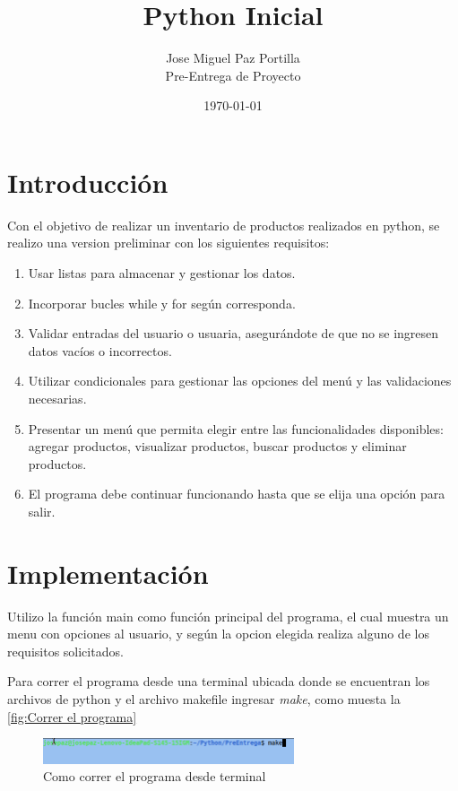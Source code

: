 \documentclass[12pt]{article}
\title{Python Inicial}
\author{Jose Miguel Paz Portilla\\Pre-Entrega de Proyecto}
\date{\today}
\begin{document}
\maketitle
\thispagestyle{empty}
\newpage

\tableofcontents
\newpage

\section{Introducción}

Con el objetivo de realizar un inventario de productos realizados en python, se realizo una version preliminar con los siguientes requisitos:

\begin{enumerate}
	\item Usar listas para almacenar y gestionar los datos.
	\item Incorporar bucles while y for según corresponda. 
	\item Validar entradas del usuario o usuaria, asegurándote de que no se ingresen datos vacíos o incorrectos.
	\item Utilizar condicionales para gestionar las opciones del menú y las validaciones necesarias.
	\item Presentar un menú que permita elegir entre las funcionalidades disponibles: agregar productos, visualizar productos, buscar productos y eliminar productos.
	\item El programa debe continuar funcionando hasta que se elija una opción para salir.
\end{enumerate}

\section{Implementación}

Utilizo la función main como función principal del programa, el cual muestra un menu con opciones al usuario, y según la opcion elegida realiza alguno de los requisitos solicitados.

Para correr el programa desde una terminal ubicada donde se encuentran los archivos de python y el archivo makefile ingresar \textit{make}, como muesta la \autoref{fig:Correr el programa}

\begin{figure}[H]
	\centering
	\setlength{\fboxrule}{0pt}
	\includegraphics[width=0.66\textwidth]{Imagenes/img7.png}
	\caption{Como correr el programa desde terminal}
	\label{fig:Correr el programa}
\end{figure}  
\end{document}
